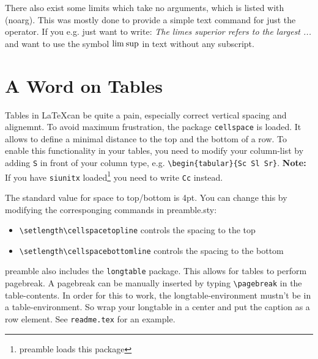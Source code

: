 \documentclass{report}
\begin{document}
  There also exist some limits which take no arguments, which is listed with (noarg). This was mostly done
  to provide a simple text command for just the operator. If you e.g. just want to write: 
  \textit{The limes superior refers to the largest ...} and want to use the symbol $\mathrm{lim}\:\mathrm{sup}$ in text without any
  subscript.

  \section{A Word on Tables}
    Tables in \LaTeX can be quite a pain, especially correct vertical spacing and alignemnt. To avoid maximum 
    frustration, the package \lstinline|cellspace| is loaded. It allows to define a minimal distance to the top
    and the bottom of a row. To enable this functionality in your tables, you need to modify your column-list by
    adding \lstinline|S| in front of your column type, e.g. \lstinline|\begin{tabular}{Sc Sl Sr}|. 
    \textbf{Note:} If you have \lstinline|siunitx| loaded\footnote{preamble loads this package} you need to
    write \lstinline|Cc| instead.  

    The standard value for space to top/bottom is 4pt. You can change this by modifying the corresponging commands
    in preamble.sty:
    \begin{itemize}
      \item \lstinline|\setlength\cellspacetopline|  controls the spacing to the top
      \item \lstinline|\setlength\cellspacebottomline| controls the spacing to the bottom
    \end{itemize}

    preamble also includes the \lstinline|longtable| package. This allows for tables to perform pagebreak. A
    pagebreak can be manually inserted by typing \lstinline|\pagebreak| in the table-contents. In order for
    this to work, the longtable-environment mustn't be in a table-environment. So wrap your longtable in
    a center and put the caption as a row element. See \lstinline|readme.tex| for an example.
  \newpage
\end{document}
